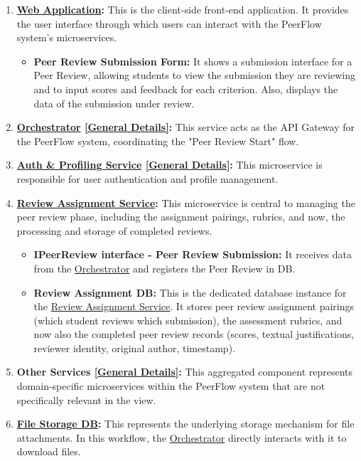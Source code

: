 \begin{enumerate}
     \item \textbf{\hyperref[def:WebApplication]{Web Application}:} This is the client-side front-end application. It provides the user interface through which users can interact with the PeerFlow system’s microservices.
    \begin{itemize}
        \item \textbf{Peer Review Submission Form:} It shows a submission interface for a Peer Review, allowing students to view the submission they are reviewing and to input scores and feedback for each criterion. Also, displays the data of the submission under review.
    \end{itemize}
    
    \item \textbf{\hyperref[def:Orchestrator]{Orchestrator} \hyperref[def:GenDetailsOrchestrator]{[General Details]}:} This service acts as the API Gateway for the PeerFlow system, coordinating the "Peer Review Start" flow.

    \item \textbf{\hyperref[def:AuthProfilingService]{Auth \& Profiling Service} \hyperref[def:GenDetailsAuth]{[General Details]}:} This microservice is responsible for user authentication and profile management.
    
    \item \textbf{\hyperref[def:ReviewAssignmentService]{Review Assignment Service}:} This microservice is central to managing the peer review phase, including the assignment pairings, rubrics, and now, the processing and storage of completed reviews.
    \begin{itemize}
        \item \textbf{IPeerReview interface - Peer Review Submission:} It receives data from the \hyperref[def:Orchestrator]{Orchestrator} and registers the Peer Review in DB.
    
        \item \textbf{Review Assignment DB:} This is the dedicated database instance for the \hyperref[def:ReviewAssignmentService]{Review Assignment Service}. It stores peer review assignment pairings (which student reviews which submission), the assessment rubrics, and now also the completed peer review records (scores, textual justifications, reviewer identity, original author, timestamp).
    \end{itemize}
    
    \item \textbf{Other Services \hyperref[def:GenDetailsOtherServices]{[General Details]}:} This aggregated component represents domain-specific microservices within the PeerFlow system that are not specifically relevant in the view.
    
    \item \textbf{\hyperref[def:FileStorageService]{File Storage DB}:} This represents the underlying storage mechanism for file attachments. In this workflow, the \hyperref[def:Orchestrator]{Orchestrator} directly interacts with it to download files. 
\end{enumerate}


